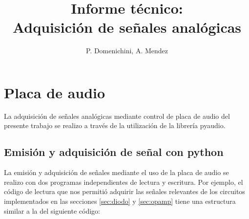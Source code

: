 \documentclass[a4paper,10pt]{article}
\title{Informe técnico: \\
Adquisición de señales analógicas}
\author{P. Domenichini, A. Mendez}
\begin{document}
\maketitle



\section{Placa de audio}
La adquisición de señales analógicas mediante control de placa 
de audio del presente trabajo se realizo a través de la utilización
de la librería {\sc pyaudio}. 


\subsection{Emisión y adquisición de señal con python}
La emisión y adquisición de señales mediante el uso de la placa
de audio se realizo con dos programas independientes de lectura y escritura. 
Por ejemplo, el código de lectura que nos permitió
adquirir las señales relevantes de los circuitos implementados en las 
secciones \ref{sec:diodo} y \ref{sec:opamp} tiene una estructura similar 
a la del siguiente código:
\end{document}
